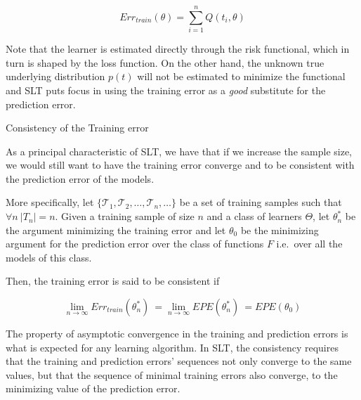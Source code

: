 \begin{appendices}
\begin{equation}\label{vapnik-empiricalRisk}
Err_{train}(\theta) = \sum_{i=1}^n Q(t_i,\theta)
\end{equation}

Note that the learner is estimated directly through the risk functional, which in turn is shaped by the loss function.
On the other hand, the unknown true underlying distribution $p(t)$ will not be estimated to minimize the functional and SLT puts focus in using the training error as a \textit{good} substitute for the prediction error.




\begin{definition}{Consistency of the Training error}

As a principal characteristic of SLT, we have that if we increase the sample size, we would still want to have the training error converge and to be consistent with the prediction error of the models.

More specifically, let $\{\mathcal {T}_1, \mathcal {T}_2, \ldots, \mathcal {T}_n, \ldots \}$ be a set of training samples such that $\forall n \ |T_n|=n$.
Given a training sample of size $n$ and a class of learners $\Theta$, let $\theta^{*}_n$ be the argument minimizing the training error and let $\theta_0$ be the minimizing argument for the prediction error over the class of functions $F$ i.e.\ over all the models of this class.

Then, the training error is said to be consistent if

\begin{equation}
\lim_{n\to\infty} Err_{train}(\theta^{*}_n) \ = \lim_{n\to\infty} EPE(\theta^{*}_n) \ = EPE(\theta_0)
\end{equation}

\end{definition}

The property of asymptotic convergence in the training and prediction errors is what is expected for any learning algorithm.
In SLT, the consistency requires that the training and prediction errors' sequences not only converge to the same values, but that the sequence of minimal training errors also converge, to the minimizing value of the prediction error.


\end{appendices}
